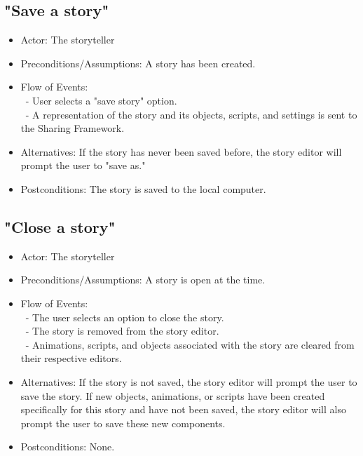 \documentclass[12pt]{article}
\begin{document}
		\subsection{"Save a story"}
\begin{itemize}
	\item Actor: The storyteller 
		\item Preconditions/Assumptions: A story has been created.
	\item Flow of Events: \\
	\	- User selects a "save story" option. \\
	\	- A representation of the story and its objects, scripts, and settings is sent to the Sharing Framework.
	\item Alternatives: If the story has never been saved before, the story editor will prompt
	the user to "save as."
	\item Postconditions: The story is saved to the local computer.
\end{itemize}
	
		\subsection{"Close a story"}
\begin{itemize}
	\item Actor: The storyteller
		\item Preconditions/Assumptions: A story is open at the time.
	\item Flow of Events: \\
	\	- The user selects an option to close the story. \\
	\	- The story is removed from the story editor. \\
	\	- Animations, scripts, and objects associated with the story are cleared from their respective editors.
	\item Alternatives: If the story is not saved, the story editor will prompt the user to
	save the story. If new objects, animations, or scripts have been created specifically for this
	story and have not been saved, the story editor will also prompt the user to save these
	new components.
	\item Postconditions: None.
\end{itemize}
	
\end{document}
